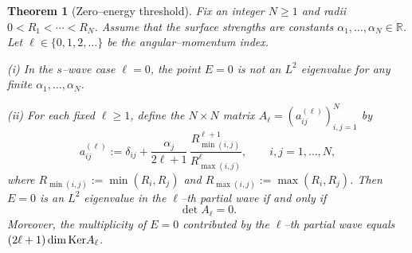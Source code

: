 \documentclass[a4paper,11pt]{article}
\numberwithin{equation}{section}
\renewcommand{\ker}{\text{\rm Ker}}
\newtheorem{thm}{Theorem}
\theoremstyle{definition}
\theoremstyle{remark}
\begin{document}
\begin{thm}[Zero--energy threshold]\label{thm:zero-energy}
Fix an integer $N\ge1$ and radii $0<R_1<\cdots<R_N$.
Assume that the surface strengths are constants $\alpha_1,\dots,\alpha_N\in\mathbb R$.
Let $\ell\in\{0,1,2,\dots\}$ be the angular--momentum index.

{\rm (i)} In the $s$--wave case $\ell=0$, the point $E=0$ is not an $L^2$
eigenvalue for any finite $\alpha_1,\dots,\alpha_N$.

{\rm (ii)} For each fixed $\ell\ge1$, define the $N\times N$ matrix
$A_\ell=(a^{(\ell)}_{ij})_{i,j=1}^N$ by
\begin{equation}\label{eq:Aell-entry}
a^{(\ell)}_{ij}
:=
\delta_{ij}
+
\frac{\alpha_j}{2\ell+1}\,
\frac{R_{\min(i,j)}^{\ell+1}}{R_{\max(i,j)}^{\ell}},
\qquad i,j=1,\dots,N,
\end{equation}
where $R_{\min(i,j)}:=\min(R_i,R_j)$ and $R_{\max(i,j)}:=\max(R_i,R_j)$.
Then $E=0$ is an $L^2$ eigenvalue in the $\ell$--th partial wave if and only if
\begin{equation}\label{eq:zero-cond}
\det A_\ell=0.
\end{equation}
Moreover, the multiplicity of $E=0$ contributed by the $\ell$--th partial wave
equals $(2\ell+1)\dim\ker A_\ell$.
\end{thm}
\end{document}
